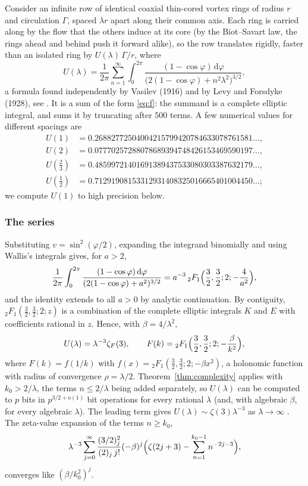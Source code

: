 \documentclass[11pt,reqno]{amsart}
\theoremstyle{definition}
\theoremstyle{remark}
\newcommand{\dd}{\,\mathrm{d}}
\begin{document}
Consider an infinite row of identical coaxial thin-cored vortex rings of radius $r$ and circulation $\Gamma$, spaced
$\lambda r$ apart along their common axis. Each ring is carried along by the flow that the others induce at its core
(by the Biot--Savart law, the rings ahead and behind push it forward alike), so the row translates rigidly, faster
than an isolated ring by $U(\lambda)\,\Gamma/r$, where
\begin{equation}\label{eq:vortex}
  U(\lambda) = \frac{1}{2\pi}\sum_{n=1}^{\infty}\int_0^{2\pi}\frac{(1-\cos\varphi)\dd\varphi}{\bigl(2(1-\cos\varphi)+n^2\lambda^2\bigr)^{3/2}},
\end{equation}
a formula found independently by Vasilev (1916) and by Levy and Forsdyke (1928), see \cite{MS22}. It is a sum of the
form \eqref{eq:f}: the summand is a complete elliptic integral, and \cite{MS22} sums it by truncating after $500$ terms.
A few numerical values for different spacings are
\begin{align*}
  U(1)        &= 0.26882772504004215799420784633078761581\ldots, \\
  U(2)        &= 0.07770257288078689394748426153469590197\ldots, \\
  U(\tfrac23) &= 0.48599721401691389437533080303387632179\ldots, \\
  U(\tfrac12) &= 0.71291908153312931408325016665401004450\ldots;
\end{align*}
we compute $U(1)$ to high precision below.

\subsubsection{The series}
Substituting $v = \sin^2(\varphi/2)$, expanding the integrand binomially and using Wallis's integrals gives, for $a > 2$,
\[
  \frac1{2\pi}\int_0^{2\pi}\frac{(1-\cos\varphi)\dd\varphi}{(2(1-\cos\varphi)+a^2)^{3/2}}
  = a^{-3}\,{}_2F_1\Bigl(\frac32,\frac32;2;-\frac4{a^2}\Bigr),
\]
and the identity extends to all $a > 0$ by analytic continuation. By contiguity, ${}_2F_1(\frac32,\frac32;2;z)$ is a
combination of the complete elliptic integrals $K$ and $E$ with coefficients rational in $z$. Hence, with
$\beta = 4/\lambda^2$,
\[
  U(\lambda) = \lambda^{-3}\zeta_F(3), \qquad F(k) = {}_2F_1\Bigl(\frac32,\frac32;2;-\frac{\beta}{k^2}\Bigr),
\]
where $F(k) = f(1/k)$ with $f(x) = {}_2F_1(\frac32,\frac32;2;-\beta x^2)$, a holonomic function with radius of convergence
$\rho = \lambda/2$. Theorem~\ref{thm:complexity} applies with $k_0 > 2/\lambda$, the terms $n \le 2/\lambda$ being added
separately, so $U(\lambda)$ can be computed to $p$ bits in $p^{3/2+o(1)}$ bit operations for every rational $\lambda$ (and,
with algebraic $\beta$, for every algebraic $\lambda$). The leading term gives $U(\lambda) \sim \zeta(3)\lambda^{-3}$ as
$\lambda \to \infty$ \cite{MS22}. The zeta-value expansion of the terms $n \ge k_0$,
\[
  \lambda^{-3}\sum_{j=0}^{\infty}\frac{(3/2)_j^2}{(2)_j\,j!}(-\beta)^j\Bigl(\zeta(2j+3) - \sum_{n=1}^{k_0-1}n^{-2j-3}\Bigr),
\]
converges like $(\beta/k_0^2)^j$.
\end{document}
